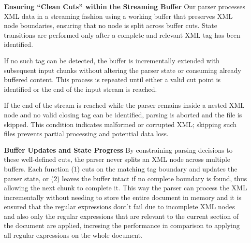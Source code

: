 \documentclass[conference]{IEEEtran}
\begin{document}
\textbf{Ensuring ``Clean Cuts'' within the Streaming Buffer}
Our parser processes XML data in a streaming fashion using a working buffer that preserves XML node boundaries, ensuring that no node is split across buffer cuts. State transitions are performed only after a complete and relevant XML tag has been identified.

If no such tag can be detected, the buffer is incrementally extended with subsequent input chunks without altering the parser state or consuming already buffered content. This process is repeated until either a valid cut point is identified or the end of the input stream is reached.

If the end of the stream is reached while the parser remains inside a nested XML node and no valid closing tag can be identified, parsing is aborted and the file is skipped. This condition indicates malformed or corrupted XML; skipping such files prevents partial processing and potential data loss.

\textbf{Buffer Updates and State Progress}
By constraining parsing decisions to these well-defined cuts, the parser never splits an XML node across multiple buffers. Each function (1) cuts on the matching tag boundary and updates the parser state, or (2) leaves the buffer intact if no complete boundary is found, thus allowing the next chunk to complete it. This way the parser can process the XML incrementally without needing to store the entire document in memory and it is ensured that the regular expressions dont't fail due to incomplete XML nodes and also only the regular expressions that are relevant to the current section of the document are applied, incresing the performance in comparison to applying all regular expressions on the whole document.
\end{document}
